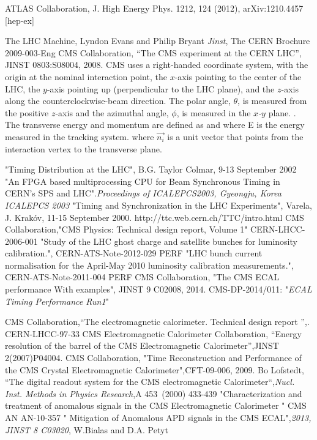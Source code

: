 \begin{thebibliography}{9}
ATLAS Collaboration, J. High Energy Phys. 1212, 124
(2012), arXiv:1210.4457 [hep-ex]

 The LHC Machine, Lyndon Evans and Philip Bryant \textit{Jinst},
 The CERN Brochure 2009-003-Eng
CMS Collaboration, ``The CMS experiment at the CERN LHC'', JINST 0803:S08004, 2008.
CMS uses a right-handed coordinate system, with the origin at the nominal interaction point, the \emph{$x$}-axis pointing to the center of the LHC, 
the \emph{$y$}-axis pointing up (perpendicular to the LHC plane), and the \emph{$z$}-axis along the counterclockwise-beam direction. The polar angle, $\theta$, 
is measured from the positive \emph{$z$}-axis and the azimuthal angle, $\phi$, is measured in the \emph{$x$-$y$} plane. . 
The transverse energy and momentum are defined as  and  where \textsc{E} is the energy measured in the 
tracking system. where $\vec{n_{i}}$ is a unit vector that points from the interaction vertex to the transverse plane.

 "Timing Distribution at the LHC",  B.G. Taylor Colmar, 9-13 September 2002
 "An FPGA based multiprocessing CPU for Beam
Synchronous Timing in CERN’s SPS and LHC".\emph{Proceedings of ICALEPCS2003, Gyeongju, Korea
ICALEPCS 2003}
 "Timing and Synchronization in the LHC Experiments", Varela, J. Krakóv, 11-15 September 2000.
 http://ttc.web.cern.ch/TTC/intro.html
CMS Collaboration,"CMS Physics: Technical design report, Volume 1" CERN-LHCC-2006-001
 "Study of the LHC ghost charge and
satellite bunches for luminosity calibration.", CERN-ATS-Note-2012-029 PERF
 "LHC bunch current normalisation for the April-May 2010 luminosity calibration measurements.", CERN-ATS-Note-2011-004 PERF
CMS Collaboration, "The CMS ECAL performance With examples", JINST 9 C02008, 2014.
 CMS-DP-2014/011: "\textit{ECAL Timing Performance Run1}"


CMS Collaboration,``The electromagnetic calorimeter. Technical design report '',. CERN-LHCC-97-33
CMS Electromagnetic Calorimeter Collaboration, ``Energy resolution of the barrel of the CMS Electromagnetic Calorimeter'',JINST 2(2007)P04004.
CMS Collaboration, "Time Reconstruction and Performance of the CMS Crystal Electromagnetic Calorimeter",CFT-09-006, 2009.
 Bo Lofstedt, ``The digital readout system for the CMS electromagnetic Calorimeter``,\textit{Nucl. Inst.  Methods in Physics Research},A 453~(2000) 433-439
 "Characterization and treatment of anomalous signals in the CMS Electromagnetic Calorimeter " CMS AN AN-10-357
 " Mitigation of Anomalous APD signals in the CMS ECAL",\textit{2013, JINST 8 C03020}, W.Bialas and D.A. Petyt


\end{thebibliography}
